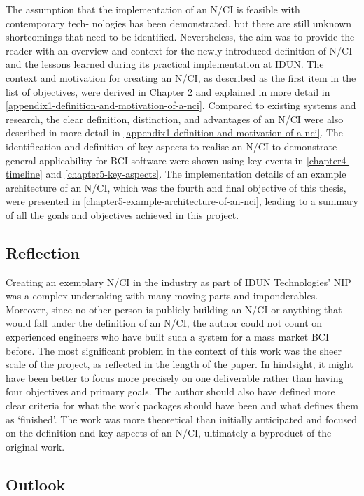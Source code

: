 The assumption that the implementation of an N/CI is feasible with contemporary tech- nologies has been demonstrated, but there are still unknown shortcomings that need to be identified. Nevertheless, the aim was to provide the reader with an overview and context for the newly introduced definition of N/CI and the lessons learned during its practical implementation at IDUN. The context and motivation for creating an N/CI, as described as the first item in the list of objectives, were derived in Chapter 2 and explained in more detail in \autoref{appendix1-definition-and-motivation-of-a-nci}. Compared to existing systems and research, the clear definition, distinction, and advantages of an N/CI were also described in more detail in \autoref{appendix1-definition-and-motivation-of-a-nci}. The identification and definition of key aspects to realise an N/CI to demonstrate general applicability for BCI software were shown using key events in \autoref{chapter4-timeline} and \autoref{chapter5-key-aspects}. The implementation details of an example architecture of an N/CI, which was the fourth and final objective of this thesis, were presented in \autoref{chapter5-example-architecture-of-an-nci}, leading to a summary of all the goals and objectives achieved in this project.

\subsection{Reflection}
\label{chapter5-reflection}

Creating an exemplary N/CI in the industry as part of IDUN Technologies’ NIP was a complex undertaking with many moving parts and imponderables. Moreover, since no other person is publicly building an N/CI or anything that would fall under the definition of an N/CI, the author could not count on experienced engineers who have built such a system for a mass market BCI before. The most significant problem in the context of this work was the sheer scale of the project, as reflected in the length of the paper. In hindsight, it might have been better to focus more precisely on one deliverable rather than having four objectives and primary goals. The author should also have defined more clear criteria for what the work packages should have been and what defines them as ‘finished’. The work was more theoretical than initially anticipated and focused on the definition and key aspects of an N/CI, ultimately a byproduct of the original work.

\subsection{Outlook}
\label{chapter5-outlook}

